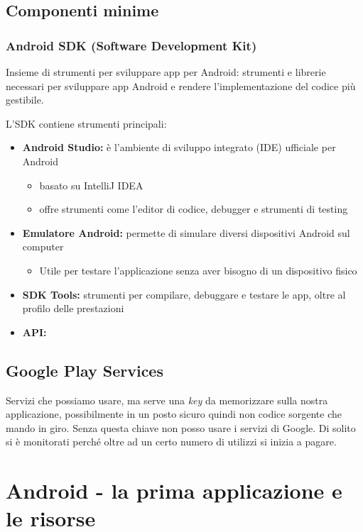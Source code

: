 \section{Componenti minime}
\subsection{Android SDK (Software Development Kit)}
\par Insieme di strumenti per sviluppare app per Android: strumenti e librerie necessari per sviluppare app Android e rendere l'implementazione del codice più gestibile.
\par L'SDK contiene strumenti principali:
\begin{itemize}
    \item \textbf{Android Studio:} è l'ambiente di sviluppo integrato (IDE) ufficiale per Android
    \begin{itemize}
        \item basato su IntelliJ IDEA
        \item offre strumenti come l'editor di codice, debugger e strumenti di testing
    \end{itemize}
    \item \textbf{Emulatore Android:} permette di simulare diversi dispositivi Android sul computer
    \begin{itemize}
        \item Utile per testare l'applicazione senza aver bisogno di un dispositivo fisico
    \end{itemize}
    \item \textbf{SDK Tools:} strumenti per compilare, debuggare e testare le app, oltre al profilo delle prestazioni
    \item \textbf{API:} 
\end{itemize}

\section{Google Play Services}
\par Servizi che possiamo usare, ma serve una \textit{key} da memorizzare sulla nostra applicazione, possibilmente in un posto sicuro quindi non codice sorgente che mando in giro. Senza questa chiave non posso usare i servizi di Google. Di solito si è monitorati perché oltre ad un certo numero di utilizzi si inizia a pagare.

\chapter{Android - la prima applicazione e le risorse}
